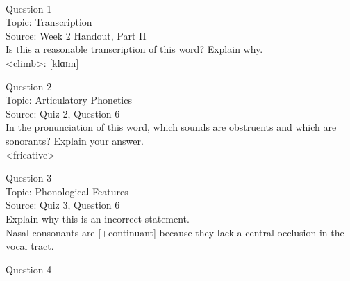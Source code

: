 \documentclass[12pt]{article}
\begin{document}
\newpage

\begin{center}
\textbf{{\color{red}{\HUGE END OF EXAM}}}\\

\end{center}
\newpage

\begin{center}
\textbf{{\color{blue}{\HUGE START OF EXAM\\}}}

\textbf{{\color{blue}{\HUGE Student ID: 50775\\}}}

\textbf{{\color{blue}{\HUGE \\}}}

\end{center}
\newpage

{\large Question 1}\\

Topic: Transcription\\
Source: Week 2 Handout, Part II\\

Is this a reasonable transcription of this word? Explain why.\\

<climb>: {[klɑɪm]}


\newpage

{\large Question 2}\\

Topic: Articulatory Phonetics\\
Source: Quiz 2, Question 6\\

In the pronunciation of this word, which sounds are obstruents and which are sonorants? Explain your answer.\\

<fricative>


\newpage

{\large Question 3}\\

Topic: Phonological Features\\
Source: Quiz 3, Question 6\\

Explain why this is an incorrect statement.\\

Nasal consonants are {[+continuant]} because they lack a central occlusion in the vocal tract.


\newpage

{\large Question 4}\\
\end{document}
